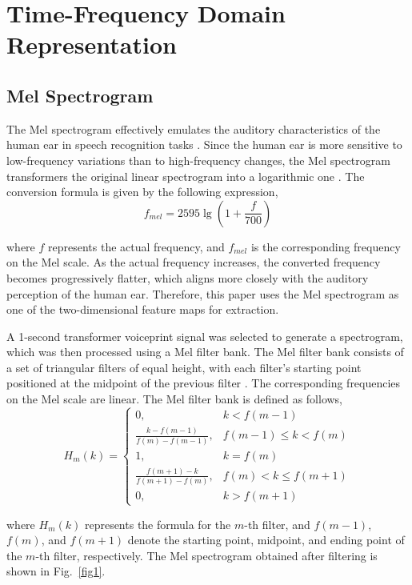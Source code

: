 \documentclass[final,5p,times,twocolumn]{elsarticle}
\begin{document}
\section{Time-Frequency Domain Representation}

\subsection{Mel Spectrogram}
\label{subsec1}
The Mel spectrogram effectively emulates the auditory characteristics of the human ear in speech recognition tasks \cite{WANG2026119319,10768989}. Since the human ear is more sensitive to low-frequency variations than to high-frequency changes, the Mel spectrogram transformers the original linear spectrogram into a logarithmic one \cite{SHAN2023112408,11097896}. The conversion formula is given by the following expression,
\begin{equation}
	f_{mel} = 2595 \lg\left(1 + \frac{f}{700}\right)
\end{equation}

\noindent where \( f \) represents the actual frequency, and \(f_{mel}\) is the corresponding frequency on the Mel scale. As the actual frequency increases, the converted frequency becomes progressively flatter, which aligns more closely with the auditory perception of the human ear. Therefore, this paper uses the Mel spectrogram as one of the two-dimensional feature maps for extraction. 

A 1-second transformer voiceprint signal was selected to generate a spectrogram, which was then processed using a Mel filter bank. The Mel filter bank consists of a set of triangular filters of equal height, with each filter's starting point positioned at the midpoint of the previous filter \cite{r1}. The corresponding frequencies on the Mel scale are linear. The Mel filter bank is defined as follows,
\begin{equation}
	H_m(k) = 
	\begin{cases} 
		0, & k < f(m-1) \\
		\frac{k - f(m-1)}{f(m) - f(m-1)}, & f(m-1) \leq k < f(m) \\
		1, & k = f(m) \\
		\frac{f(m+1) - k}{f(m+1) - f(m)}, & f(m) < k \leq f(m+1) \\
		0, & k > f(m+1)
	\end{cases}
\end{equation}

\noindent where \(H_m(k)\) represents the formula for the \(m\)-th filter, and \(f(m-1)\), \(f(m)\), and \(f(m+1)\) denote the starting point, midpoint, and ending point of the \(m\)-th filter, respectively. The Mel spectrogram obtained after filtering is shown in Fig.~\ref{fig1}.
\end{document}
